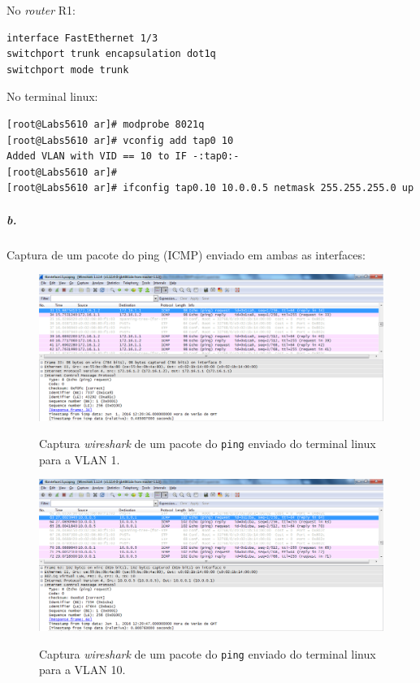 No \emph{router} \textsf{R1}:
\begin{verbatim}
interface FastEthernet 1/3
switchport trunk encapsulation dot1q
switchport mode trunk
\end{verbatim}

No terminal \textsf{linux}:
\begin{verbatim}
[root@Labs5610 ar]# modprobe 8021q
[root@Labs5610 ar]# vconfig add tap0 10
Added VLAN with VID == 10 to IF -:tap0:-
[root@Labs5610 ar]# 
[root@Labs5610 ar]# ifconfig tap0.10 10.0.0.5 netmask 255.255.255.0 up
\end{verbatim}

\newpage

\subparagraph{b.}
Captura de um pacote do \textsf{ping} (ICMP) enviado em ambas as interfaces:

\begin{figure}[h]
\centering
\includegraphics[width=1\textwidth, height=0.32\textheight]{4_ping_VLAN1.png}
\label{fig:5-capturaWireshark}
\caption{Captura \emph{wireshark} de um pacote do \texttt{ping} enviado do terminal \textsf{linux} para a \textsf{VLAN 1}.}
\end{figure}

\begin{figure}[h]
\centering
\includegraphics[width=1\textwidth, height=0.32\textheight]{4_ping_VLAN10.png}
\label{fig:6-capturaWireshark}
\caption{Captura \emph{wireshark} de um pacote do \texttt{ping} enviado do terminal \textsf{linux} para a \textsf{VLAN 10}.}
\end{figure}

